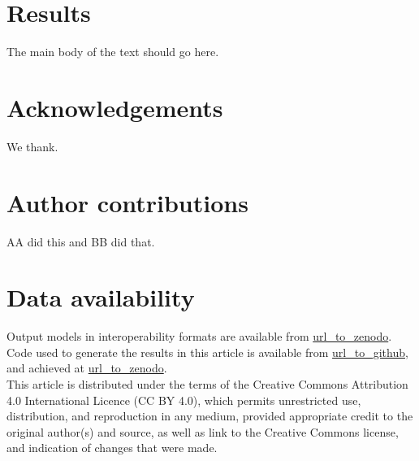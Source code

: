 \documentclass{tektonika}
\begin{document}
\section{Results}
The main body of the text should go here.
\lipsum[1]



\section*{Acknowledgements} %
We thank.


\section*{Author contributions} %
AA did this and BB did that. 

\section*{Data availability}
Output models in interoperability formats are available from \url{url_to_zenodo}. Code used to generate the results in this article is available from \url{url_to_github}, and achieved at \url{url_to_zenodo}. \\


This article is distributed under the terms of the Creative Commons Attribution 4.0 International Licence (CC BY 4.0), which permits unrestricted use, distribution, and reproduction in any medium, provided appropriate credit to the original author(s) and source, as well as link to the Creative Commons license, and indication of changes that were made.



\end{document}
